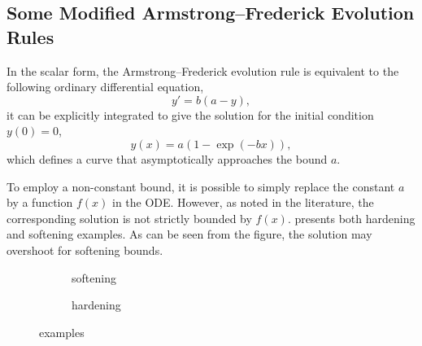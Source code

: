 \subsection{Some Modified Armstrong--Frederick Evolution Rules}
In the scalar form, the Armstrong--Frederick evolution rule is equivalent to the following ordinary differential equation,
\begin{equation}
    y'=b\left(a-y\right),
\end{equation}
it can be explicitly integrated to give the solution for the initial condition $y(0)=0$,
\begin{equation}
    y(x)=a\left(1-\exp\left(-bx\right)\right),
\end{equation}
which defines a curve that asymptotically approaches the bound $a$.

To employ a non-constant bound, it is possible to simply replace the constant $a$ by a function $f(x)$ in the ODE.
However, as noted in the literature, the corresponding solution is not strictly bounded by $f(x)$.
 presents both hardening and softening examples.
As can be seen from the figure, the solution may overshoot for softening bounds.
\begin{figure}[htb]
\centering\scriptsize
    \begin{subfigure}{0.48\textwidth}\centering
        \caption{softening}
    \end{subfigure}\hfill
    \begin{subfigure}{0.48\textwidth}\centering
        \caption{hardening}
    \end{subfigure}
    \caption{examples}\label{fig:examples}
\end{figure}
